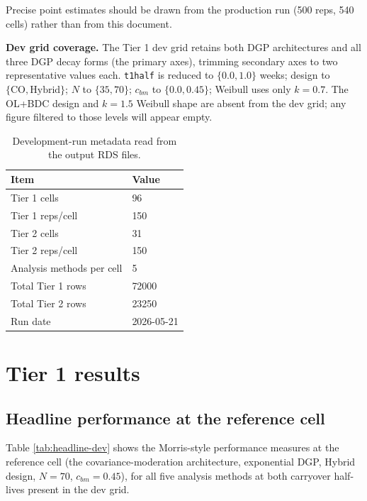 \documentclass[
  11pt,
]{article}
\begin{document}
Precise point estimates should be drawn from the production run
(500 reps, 540 cells) rather than from this document.

\textbf{Dev grid coverage.} The Tier 1 dev grid retains both DGP
architectures and all three DGP decay forms (the primary axes),
trimming secondary axes to two representative values each.
\texttt{t1half} is reduced to \(\{0.0, 1.0\}\) weeks; design to
\(\{\text{CO}, \text{Hybrid}\}\); \(N\) to \(\{35, 70\}\); \(c_{bm}\) to
\(\{0.0, 0.45\}\); Weibull uses only \(k = 0.7\). The OL+BDC design and
\(k = 1.5\) Weibull shape are absent from the dev grid; any figure
filtered to those levels will appear empty.

\begin{table}

\caption{\label{tab:meta-table}Development-run metadata read from the output RDS files.}
\centering
\begin{tabular}[t]{ll}
\toprule
Item & Value\\
\midrule
Tier 1 cells & 96\\
Tier 1 reps/cell & 150\\
Tier 2 cells & 31\\
Tier 2 reps/cell & 150\\
Analysis methods per cell & 5\\
\addlinespace
Total Tier 1 rows & 72000\\
Total Tier 2 rows & 23250\\
Run date & 2026-05-21\\
\bottomrule
\end{tabular}
\end{table}

\section{Tier 1 results}\label{tier-1-results}

\subsection{Headline performance at the reference cell}\label{headline-performance-at-the-reference-cell}

Table \ref{tab:headline-dev} shows the Morris-style performance
measures at the reference cell (the covariance-moderation architecture, exponential DGP,
Hybrid design, \(N = 70\), \(c_{bm} = 0.45\)), for all five analysis
methods at both carryover half-lives present in the dev grid.
\end{document}
